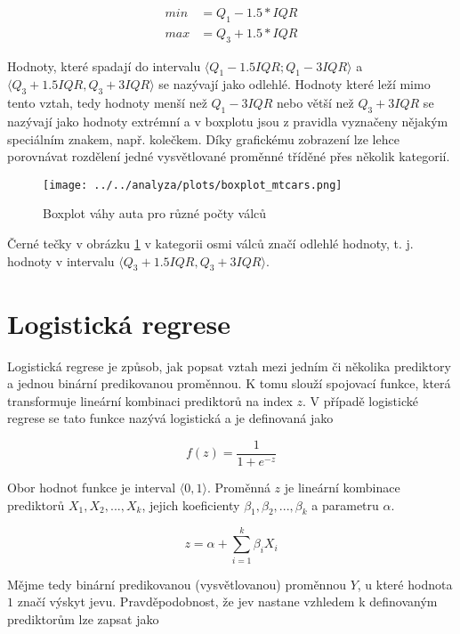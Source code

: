 \begin{align}
    min &= Q_1 - 1.5 * IQR \\
    max &= Q_3 + 1.5 * IQR
\end{align}

{\color{red}
Hodnoty, které spadají do intervalu $\langle Q_1 - 1.5IQR; Q_1 - 3IQR\rangle$ a $\langle Q_3 + 1.5IQR, Q_3 + 3IQR \rangle$ se nazývají jako odlehlé.
Hodnoty které leží mimo tento vztah, tedy hodnoty menší než $Q_1 - 3IQR$ nebo větší než $Q_3 + 3IQR$ se nazývají jako hodnoty extrémní a
v boxplotu jsou z pravidla vyznačeny nějakým speciálním znakem, např. kolečkem.
Díky grafickému zobrazení lze lehce porovnávat rozdělení jedné vysvětlované proměnné tříděné přes několik kategorií.
}

\begin{figure}[H]
    \centering
    \texttt{[image: ../../analyza/plots/boxplot\_mtcars.png]}
    \caption{Boxplot váhy auta pro různé počty válců} 
    \label{fig:boxplot_mtcars}
\end{figure}

{\color{red}
Černé tečky v obrázku \ref{fig:boxplot_mtcars} v kategorii osmi válců značí odlehlé hodnoty, t. j. hodnoty
v intervalu $\langle Q_3 + 1.5IQR, Q_3 + 3IQR \rangle$.
}

\newpage
\section{Logistická regrese}
Logistická regrese je způsob, jak popsat vztah mezi jedním či několika prediktory a jednou binární predikovanou 
proměnnou. K tomu slouží spojovací funkce, která transformuje lineární kombinaci prediktorů na index $z$. V případě
logistické regrese se tato funkce nazývá logistická a je definovaná jako

\begin{equation}
    \label{eq:logisticka_funkce}
    f(z) = \frac{1}{1 + e^{-z}}
\end{equation}

Obor hodnot funkce je interval $\langle 0, 1 \rangle$. Proměnná $z$ je lineární kombinace prediktorů  $X_1, X_2, ..., X_k$,
jejich koeficienty $\beta_1, \beta_2, ..., \beta_k$ a parametru $\alpha$.

\begin{equation}
    \label{eq:linearni_kombinace_z}
    z = \alpha + \sum_{i=1}^k \beta_i X_i
\end{equation}

Mějme tedy binární predikovanou (vysvětlovanou) proměnnou $Y$, u které hodnota $1$ značí výskyt jevu. Pravděpodobnost, že jev nastane
vzhledem k definovaným prediktorům lze zapsat jako

